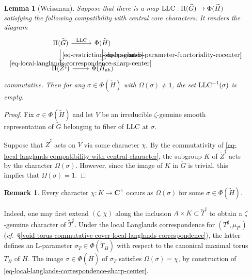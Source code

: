 \documentclass[10pt,english,reqno]{amsart}
\newcommand{\complexes}{\mathbf C}
\newcommand{\abelian}{\textnormal{ab}}
\newcommand{\LLC}{\textnormal{LLC}}
\newtheorem{lem}[subsubsection]{Lemma}
\theoremstyle{definition}
\newtheorem{rem}[subsubsection]{Remark}
\numberwithin{equation}{section}
\begin{document}
\begin{lem}[Weissman]
\label{lem-weissman-obstruction}
Suppose that there is a map $\LLC : \Pi(\widetilde G) \rightarrow \Phi(\widetilde H)$ satisfying the following compatibility with central core characters: It renders the diagram
\begin{equation}
\label{eq-local-langlands-compatibility-with-central-character}
\begin{tikzcd}
	\Pi(\widetilde G) \ar[r, "\LLC"]\ar[d, "\eqref{eq-restriction-sharp-center}"] & \Phi(\widetilde H) \ar[d, "\eqref{eq-langlands-parameter-functoriality-cocenter}"] \\
	\Pi(\widetilde Z^{\sharp}) \ar[r, "\eqref{eq-local-langlands-correspondence-sharp-center}"] & \Phi(\widetilde H_{\abelian})
\end{tikzcd}
\end{equation}
commutative. Then for any $\sigma \in \Phi(\widetilde H)$ with $\Omega(\sigma)\neq 1$, the set $\LLC^{-1}(\sigma)$ is empty.
\end{lem}
\begin{proof}
Fix $\sigma \in \Phi(\widetilde H)$ and let $V$ be an irreducible $\zeta$-genuine smooth representation of $\widetilde G$ belonging to fiber of $\LLC$ at $\sigma$.

Suppose that $\widetilde Z^{\sharp}$ acts on $V$ via some character $\chi$. By the commutativity of \eqref{eq-local-langlands-compatibility-with-central-character}, the subgroup $K$ of $\widetilde Z^{\sharp}$ acts by the character $\Omega(\sigma)$. However, since the image of $K$ in $\widetilde G$ is trivial, this implies that $\Omega(\sigma) = 1$.
\end{proof}


\begin{rem}
\label{rem-every-character-weissman-obstruction}
Every character $\chi : K \rightarrow \complexes^{\times}$ occurs as $\Omega(\sigma)$ for some $\sigma \in \Phi(\widetilde H)$.

Indeed, one may first extend $(\zeta, \chi)$ along the inclusion $A \times K \subset \widetilde T^{\sharp}$ to obtain a $\zeta$-genuine character of $\widetilde T^{\sharp}$. Under the local Langlands correspondence for $(T^{\sharp}, \mu_{T^{\sharp}})$ (\emph{cf.}~\S\ref{void-torus-commutative-cover-local-langlands-correspondence}), the latter defines an L-parameter $\sigma_T \in \Phi(\widetilde T_H)$ with respect to the canonical maximal torus $T_H$ of $H$. The image $\sigma\in\Phi(\widetilde H)$ of $\sigma_T$ satisfies $\Omega(\sigma) = \chi$, by construction of \eqref{eq-local-langlands-correspondence-sharp-center}.
\end{rem}
\end{document}

